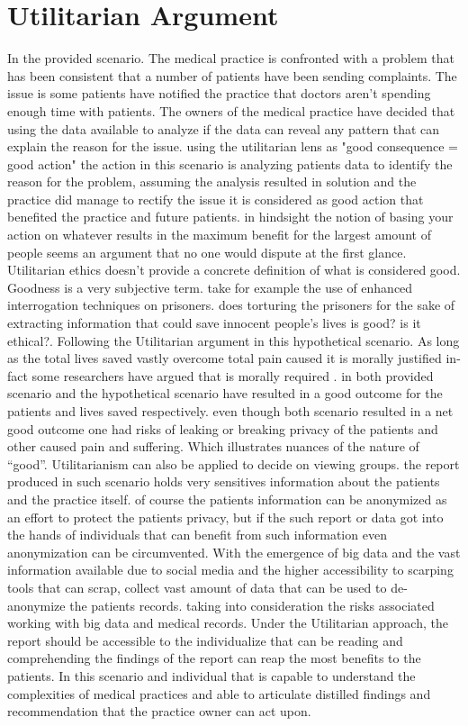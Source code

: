 \documentclass{article}
\begin{document}
\section{Utilitarian Argument}
In the provided scenario. The medical practice is confronted with a problem that has been consistent that a number of patients have been sending complaints. The issue is some patients have notified the practice that doctors aren't spending enough time with patients. The owners of the medical practice have decided that using the data available to analyze if the data can reveal any pattern that can explain the reason for the issue. using the utilitarian lens as "good consequence = good action" \cite{sep-utilitarianism-history}  the action in this scenario is analyzing patients data to identify the reason for the problem, assuming the analysis resulted in solution and the practice did manage to rectify the issue it is considered as good action that benefited the practice and future patients. in hindsight the notion of basing your action on whatever results in the maximum benefit for the largest amount of people seems an argument that no one would dispute at the first glance. Utilitarian ethics doesn't provide a concrete definition of what is considered good. Goodness is a very subjective term. take for example the use of enhanced interrogation techniques on prisoners. does torturing the prisoners for the sake of extracting information that could save innocent people's lives is good? is it ethical?. Following the Utilitarian argument in this hypothetical scenario. As long as the  total lives saved vastly overcome total pain caused it is morally justified in-fact some researchers have argued that is morally required \cite{ODonohue2014}. in both provided scenario and the hypothetical scenario have resulted in a good outcome for the patients and lives saved respectively. even though both scenario resulted in a net good outcome one had risks of leaking or breaking privacy of the patients and other caused pain and suffering. Which illustrates nuances of the nature of “good”.  Utilitarianism can also be applied to decide on viewing groups. the report produced in such scenario holds very sensitives information about the patients and the practice itself. of course the patients information can be anonymized as an effort to protect the patients privacy, but if the such report or data got into the hands of individuals that can benefit from such information even anonymization can be circumvented. With the emergence of big data and the vast information available due to social media and the higher accessibility to scarping tools that can scrap, collect vast amount of data that can be used to de-anonymize the patients records. taking into consideration the risks associated working with big data and medical records. Under the Utilitarian approach, the report should be accessible to the individualize that can be reading and comprehending the findings of the report can reap the most benefits to the patients. In this scenario and individual that is capable to understand the complexities of medical practices and able to articulate distilled findings and recommendation that the practice owner can act upon. 
\end{document}
